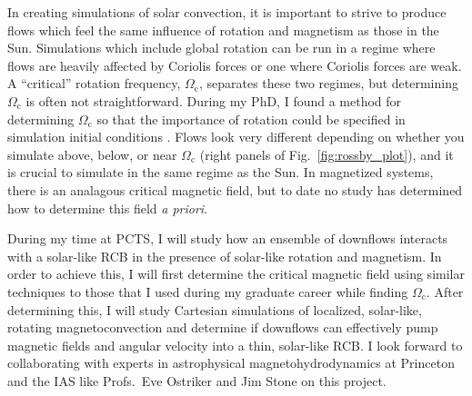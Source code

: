 \documentclass[11pt, preprint]{aastex}
\begin{document}
In creating simulations of solar convection, it is important to strive to produce flows which feel the same influence of rotation and magnetism as those in the Sun.
Simulations which include global rotation can be run in a regime where flows are heavily affected by Coriolis forces or one where Coriolis forces are weak.
A ``critical'' rotation frequency, $\Omega_\text{c}$, separates these two regimes, but determining $\Omega_\text{c}$ is often not straightforward.
During my PhD, I found a method for determining $\Omega_\text{c}$ so that the importance of rotation could be specified in simulation initial conditions \citep[see left panel of Fig. \ref{fig:rossby_plot} and][]{anders&all2019}.
Flows look very different depending on whether you simulate above, below, or near $\Omega_\text{c}$ (right panels of Fig.~\ref{fig:rossby_plot}), and it is crucial to simulate in the same regime as the Sun.
In magnetized systems, there is an analagous critical magnetic field, but to date no study has determined how to determine this field \emph{a priori}.

During my time at PCTS, I will study how an ensemble of downflows interacts with a solar-like RCB in the presence of solar-like rotation and magnetism.
In order to achieve this, I will first determine the critical magnetic field using similar techniques to those that I used during my graduate career while finding $\Omega_\text{c}$.
After determining this, I will study Cartesian simulations of localized, solar-like, rotating magnetoconvection and determine if downflows can effectively pump magnetic fields and angular velocity into a thin, solar-like RCB.
I look forward to collaborating with experts in astrophysical magnetohydrodynamics at Princeton and the IAS like Profs.~Eve Ostriker and Jim Stone on this project.

\vspace{-24pt}
\end{document}
